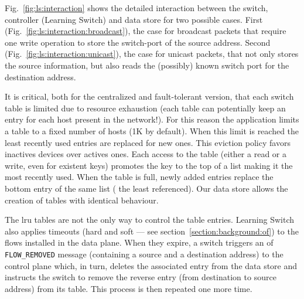 \documentclass[12pt,openright,twoside]{report}
\begin{document}
Fig.~\ref{fig:ls:interaction}  shows the detailed interaction between the switch, controller (Learning Switch) and data store for two possible cases. 
First (Fig.~\ref{fig:ls:interaction:broadcast}), the case for broadcast packets that require one write operation to store the switch-port  of the source address. 
Second (Fig.~\ref{fig:ls:interaction:unicast}),   the case for unicast packets, that not only stores the source information, but also reads the (possibly) known switch port  for the destination address.  


It is critical, both for the centralized and fault-tolerant version, that each switch table is limited due to resource exhaustion (each table can potentially keep an entry for each host present in the network!).
For this reason the application limits a table to a fixed number of hosts (1K by default).
When this limit is reached the least recently used entries are replaced for new ones.  
This eviction policy favors inactives devices over actives ones.
Each access to the table (either a read or a write, even for existent keys) promotes the key to the top of a list making it the most recently used.
When the table is full, newly added entries replace the bottom entry of the same list ( the least referenced). Our data store allows the creation of tables with identical behaviour. 

The \gls{lru} tables are not the only way to control the table entries. Learning Switch also applies timeouts (hard and soft --- see section~\ref{section:background:of})  to the flows installed in the data plane. When they expire, a switch triggers an \gls{of} \texttt{FLOW\_REMOVED} message (containing a source and a destination address) to the control plane which, in turn, deletes the associated entry from the data store and instructs the switch to remove the reverse entry (from destination to source address) from its table. This process is then repeated one more time.
\end{document}
